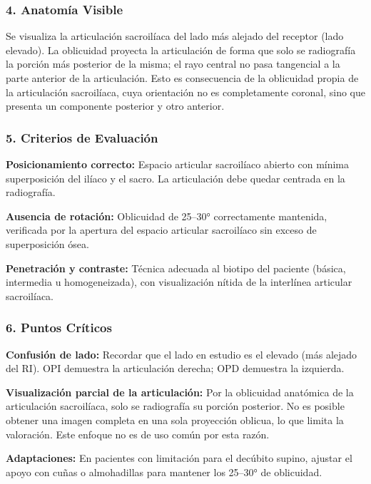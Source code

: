 		\subsubsection*{4. Anatomía Visible}
		
		Se visualiza la articulación sacroilíaca del lado más alejado del receptor (lado elevado). La oblicuidad proyecta la articulación de forma que solo se radiografía la porción más posterior de la misma; el rayo central no pasa tangencial a la parte anterior de la articulación. Esto es consecuencia de la oblicuidad propia de la articulación sacroilíaca, cuya orientación no es completamente coronal, sino que presenta un componente posterior y otro anterior.
		
		\subsubsection*{5. Criterios de Evaluación}
		
		\textbf{Posicionamiento correcto:} Espacio articular sacroilíaco abierto con mínima superposición del ilíaco y el sacro. La articulación debe quedar centrada en la radiografía.
		
		\textbf{Ausencia de rotación:} Oblicuidad de 25--30° correctamente mantenida, verificada por la apertura del espacio articular sacroilíaco sin exceso de superposición ósea.
		
		\textbf{Penetración y contraste:} Técnica adecuada al biotipo del paciente (básica, intermedia u homogeneizada), con visualización nítida de la interlínea articular sacroilíaca.
		
		\subsubsection*{6. Puntos Críticos}
		
		\textbf{Confusión de lado:} Recordar que el lado en estudio es el elevado (más alejado del RI). OPI demuestra la articulación derecha; OPD demuestra la izquierda.
		
		\textbf{Visualización parcial de la articulación:} Por la oblicuidad anatómica de la articulación sacroilíaca, solo se radiografía su porción posterior. No es posible obtener una imagen completa en una sola proyección oblicua, lo que limita la valoración. Este enfoque no es de uso común por esta razón.
		
		\textbf{Adaptaciones:} En pacientes con limitación para el decúbito supino, ajustar el apoyo con cuñas o almohadillas para mantener los 25--30° de oblicuidad.
		
